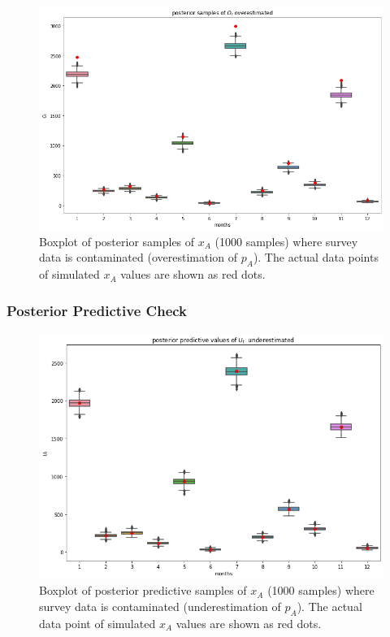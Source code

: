 \documentclass[
10pt, %
a4paper, %
oneside, %
headinclude,footinclude, %
BCOR5mm, %
]{scrartcl}
\begin{document}
\begin{figure}[htb]
	\centering
	\includegraphics[width=1\linewidth]{Figures/early_contamination_over-ot.png}
	\caption{Boxplot of posterior samples of $x_A$ (1000 samples) where survey data is contaminated (overestimation of $p_A$).  The actual data points of simulated $x_A$ values are shown as red dots.}
	\label{over_ot}
\end{figure}

\subsubsection{Posterior Predictive Check}

\begin{figure}[htb]
	\centering
	\includegraphics[width=1\linewidth]{Figures/early_contamination_under-ut.png}
	\caption{Boxplot of posterior predictive samples of $x_A$ (1000 samples) where survey data is contaminated (underestimation of $p_A$).  The actual data point of simulated $x_A$ values are shown as red dots.}
	\label{under_ut}
\end{figure}
\end{document}
